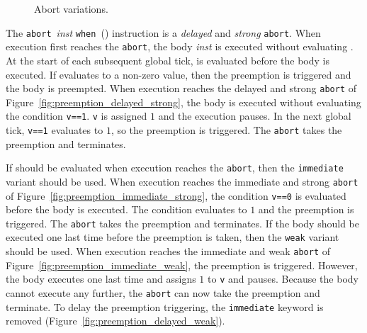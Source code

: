\begin{figure}
	\centering
	

	
	\caption{Abort variations.}
	\label{fig:forec_preemption}
\end{figure}

The \verb$abort$~\emph{inst} \verb$when$~(\expression{})
instruction is a \emph{delayed} and \emph{strong} \verb$abort$.
When execution first reaches the \verb$abort$, the body 
\emph{inst} is executed without evaluating \expression{}. At the start
of each subsequent global tick, \expression{} is evaluated 
before the body is executed. If \expression{} evaluates to a non-zero 
value, then the preemption is triggered and the body is preempted.
When execution reaches the delayed and strong \verb$abort$
of Figure~\ref{fig:preemption_delayed_strong},
the body is executed without evaluating the condition \verb$v==1$. 
\verb$v$ is assigned $1$ and the execution pauses. In 
the next global tick, \verb$v==1$ evaluates to $1$, 
so the preemption is triggered. The \verb$abort$ takes the preemption 
and terminates.

If \expression{} should be evaluated when execution reaches the \verb$abort$, 
then the \verb$immediate$ variant should be used. When execution 
reaches the immediate and strong \verb$abort$ of Figure~\ref{fig:preemption_immediate_strong},
the condition \verb$v==0$ is evaluated before the body 
is executed. The condition evaluates to $1$ and the preemption 
is triggered. The \verb$abort$ takes the preemption and terminates.
If the body should be executed one last time before the preemption 
is taken, then the \verb$weak$ variant should be used. 
When execution reaches the immediate and weak \verb$abort$ of 
Figure~\ref{fig:preemption_immediate_weak},
the preemption is triggered. 
However, the body executes one last time and assigns $1$ to \verb$v$ 
and pauses. Because the body cannot execute any further, 
the \verb$abort$ can now take the preemption and terminate.
To delay the preemption triggering, the \verb$immediate$ 
keyword is removed (Figure~\ref{fig:preemption_delayed_weak}).


